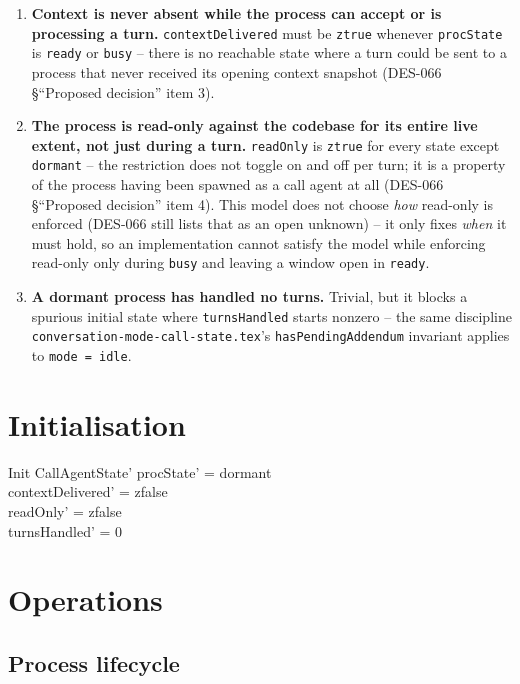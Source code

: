 \documentclass[a4paper,10pt,fleqn]{article}
\begin{document}
\begin{enumerate}
  \item \textbf{Context is never absent while the process can accept or is
    processing a turn.} \texttt{contextDelivered} must be \texttt{ztrue}
    whenever \texttt{procState} is \texttt{ready} or \texttt{busy} -- there is
    no reachable state where a turn could be sent to a process that never
    received its opening context snapshot (DES-066 \S``Proposed decision''
    item 3).
  \item \textbf{The process is read-only against the codebase for its entire
    live extent, not just during a turn.} \texttt{readOnly} is \texttt{ztrue}
    for every state except \texttt{dormant} -- the restriction does not
    toggle on and off per turn; it is a property of the process having been
    spawned as a call agent at all (DES-066 \S``Proposed decision'' item 4).
    This model does not choose \emph{how} read-only is enforced (DES-066
    still lists that as an open unknown) -- it only fixes \emph{when} it must
    hold, so an implementation cannot satisfy the model while enforcing
    read-only only during \texttt{busy} and leaving a window open in
    \texttt{ready}.
  \item \textbf{A dormant process has handled no turns.} Trivial, but it
    blocks a spurious initial state where \texttt{turnsHandled} starts
    nonzero -- the same discipline
    \texttt{conversation-mode-call-state.tex}'s \texttt{hasPendingAddendum}
    invariant applies to \texttt{mode = idle}.
\end{enumerate}

\section{Initialisation}

\begin{schema}{Init}
  CallAgentState'
  \where
  procState' = dormant \\
  contextDelivered' = zfalse \\
  readOnly' = zfalse \\
  turnsHandled' = 0
\end{schema}

\section{Operations}

\subsection{Process lifecycle}
\end{document}
